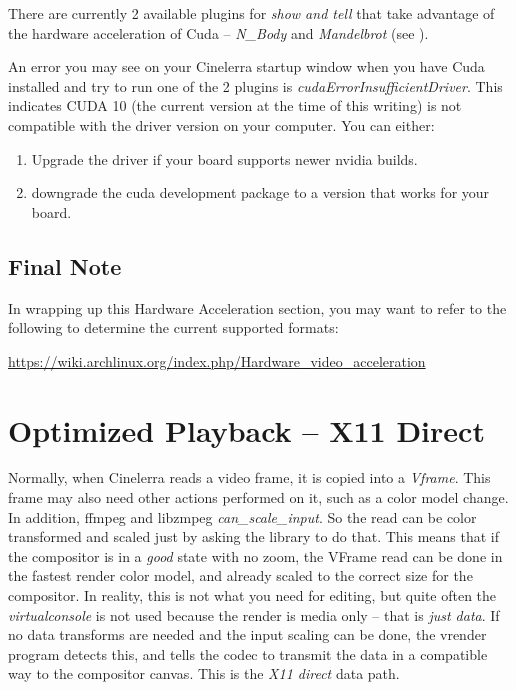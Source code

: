 There are currently 2 available plugins for \textit{show and tell} that take advantage of the hardware acceleration of Cuda -- \textit{N\_Body} and \textit{Mandelbrot} (see ).

An error you may see on your Cinelerra startup window when you have Cuda installed and try to run one of the 2 plugins is \textit{cudaErrorInsufficientDriver}.  This indicates CUDA 10 (the current version at the time of this writing) is not compatible with the driver version on your computer.  You can either:

\begin{enumerate}
	\item Upgrade the driver if your board supports newer nvidia builds.
	\item downgrade the cuda development package to a version that works for your board.
\end{enumerate}

\subsection{Final Note}%
\label{sub:final_note_on_acceleration}

In wrapping up this Hardware Acceleration section, you may want to refer to the following to determine the current supported formats:

{\small \url{https://wiki.archlinux.org/index.php/Hardware_video_acceleration}}

\section{Optimized Playback -- X11 Direct}%
\label{sec:optimized_playback}

Normally, when Cinelerra reads a video frame, it is copied into a \textit{Vframe}.  This frame may also need other actions performed on it, such as a color model change.  In addition, ffmpeg and libzmpeg \textit{can\_scale\_input}.  So the read can be color transformed and scaled just by asking the library to do that.  This means that if the compositor is in a \textit{good} state with no zoom, the VFrame read can be done in the fastest render color model, and already scaled to the correct size for the compositor.  In reality, this is not what you need for editing, but quite often the \textit{virtualconsole} is not used because the render is media only -- that is \textit{just data}.  If no data transforms are needed and the input scaling can be done, the vrender program detects this, and tells the codec to transmit the data in a compatible way to the compositor canvas. This is the \textit{X11 direct} data path.

